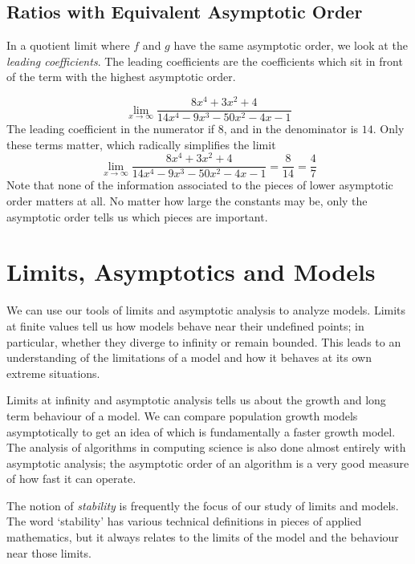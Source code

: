 \documentclass[fleqn]{report}
\begin{document}
\section*{Ratios with Equivalent Asymptotic Order}

In a quotient limit where $f$ and $g$ have the same asymptotic
order, we look at the \emph{leading coefficients}. The leading
coefficients are the coefficients which sit in front of the
term with the highest asymptotic order. 

\begin{example}
\begin{equation*}
\lim_{x \rightarrow \infty} \frac{8x^4 + 3x^2 + 4}{14x^4 -
9x^3 - 50x^2 - 4x - 1}
\end{equation*}
The leading coefficient in the numerator if $8$, and in the
denominator is $14$. Only these terms matter, which radically
simplifies the limit
\begin{equation*}
\lim_{x \rightarrow \infty} \frac{8x^4 + 3x^2 + 4}{14x^4 -
9x^3 - 50x^2 - 4x - 1} = \frac{8}{14} = \frac{4}{7}
\end{equation*}
Note that none of the information associated to the pieces of
lower asymptotic order matters at all. No matter how large
the constants may be, only the asymptotic order tells us which
pieces are important.
\end{example}

\chapter{Limits, Asymptotics and Models}
\label{Limits, Asymptotics and Models}

We can use our tools of limits and asymptotic analysis to
analyze models. Limits at finite values tell us how models
behave near their undefined points; in particular, whether
they diverge to infinity or remain bounded. This leads to an
understanding of the limitations of a model and how it behaves
at its own extreme situations.

Limits at infinity and asymptotic analysis tells us about the
growth and long term behaviour of a model. We can compare
population growth models asymptotically to get an idea of
which is fundamentally a faster growth model. The analysis of
algorithms in computing science is also done almost entirely
with asymptotic analysis; the asymptotic order of an algorithm
is a very good measure of how fast it can operate. 

The notion of \emph{stability} is frequently the focus of our
study of limits and models. The word `stability' has various
technical definitions in pieces of applied mathematics, but it
always relates to the limits of the model and the behaviour
near those limits. 
\end{document}

